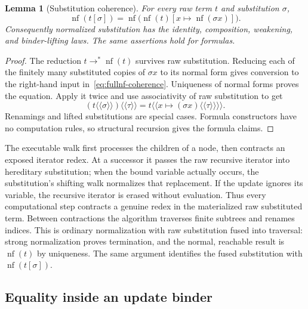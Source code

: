 \documentclass[11pt,letterpaper]{article}
\newtheorem{lemma}[theorem]{Lemma}
\theoremstyle{definition}
\theoremstyle{remark}
\begin{document}
\begin{lemma}[Substitution coherence]
\label{lem:fullnf-substitution}
For every raw term $t$ and substitution $\sigma$,
\begin{equation}
 \operatorname{nf}(t[\sigma])
 =\operatorname{nf}\bigl(\operatorname{nf}(t)
                     [x\mapsto\operatorname{nf}(\sigma x)]\bigr).
\label{eq:fullnf-coherence}
\end{equation}
Consequently normalized substitution has the identity, composition,
weakening, and binder-lifting laws.  The same assertions hold for formulas.
\end{lemma}
\begin{proof}
The reduction $t\longrightarrow^*\operatorname{nf}(t)$ survives raw
substitution.  Reducing each of the finitely many substituted copies of
$\sigma x$ to its normal form gives conversion to the right-hand input
in~\eqref{eq:fullnf-coherence}.  Uniqueness of normal forms proves the
equation.  Apply it twice and use associativity of raw substitution to get
\[
 (t\langle\!\langle\sigma\rangle\!\rangle)
       \langle\!\langle\tau\rangle\!\rangle
 =t\langle\!\langle
          x\mapsto(\sigma x)\langle\!\langle\tau\rangle\!\rangle
       \rangle\!\rangle.
\]
Renamings and lifted substitutions are special cases.  Formula constructors
have no computation rules, so structural recursion gives the formula claims.
\end{proof}

The executable walk first processes the children of a node, then contracts
an exposed iterator redex.  At a successor it passes the raw recursive
iterator into hereditary substitution; when the bound variable actually
occurs, the substitution's shifting walk normalizes that replacement.
If the update ignores its variable, the recursive iterator is erased
without evaluation.  Thus every computational step contracts a genuine
redex in the materialized raw substituted term.  Between contractions the
algorithm traverses finite subtrees and renames indices.  This is ordinary
normalization with raw substitution fused into traversal: strong
normalization proves termination, and the normal, reachable result is
$\operatorname{nf}(t)$ by uniqueness.  The same argument identifies the
fused substitution with $\operatorname{nf}(t[\sigma])$.

\subsection{Equality inside an update binder}
\end{document}
